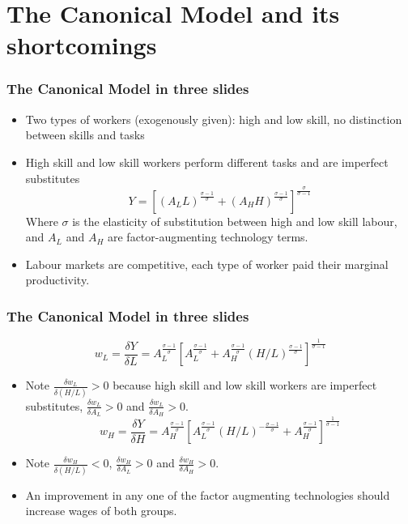 \documentclass[mathserif]{beamer}
\begin{document}
\section{The Canonical Model and its shortcomings}
\begin{frame}
\frametitle{The Canonical Model in three slides}
\begin{itemize}
\item Two types of workers (exogenously given): high and low skill, no distinction between skills and tasks
\item High skill and low skill workers perform different tasks and are imperfect substitutes
\begin{equation*}
Y=[(A_LL)^\frac{\sigma-1}{\sigma}+(A_HH)^\frac{\sigma-1}{\sigma}]^\frac{\sigma}{\sigma-1}
\end{equation*}
Where $\sigma$ is the elasticity of substitution between high and low skill labour, and $A_L$ and $A_H$ are factor-augmenting technology terms.
\item Labour markets are competitive, each type of worker paid their marginal productivity.
\end{itemize}
\end{frame}
\begin{frame}
\frametitle{The Canonical Model in three slides}
\begin{equation*}
w_L=\frac{\delta Y}{\delta L}=A_L^{\frac{\sigma-1}{\sigma}}[A_L^{\frac{\sigma-1}{\sigma}}+A_H^{\frac{\sigma-1}{\sigma}}(H/L)^{\frac{\sigma-1}{\sigma}}]^\frac{1}{\sigma-1}
\end{equation*}
\begin{itemize}
\item Note $\frac{\delta w_L}{\delta (H/L)}>0$ because high skill and low skill workers are imperfect substitutes, $\frac{\delta w_L}{\delta A_L}>0$  and $\frac{\delta w_L}{\delta A_H}>0$.
\begin{equation*}
w_H=\frac{\delta Y}{\delta H}=A_H^\frac{\sigma-1}{\sigma}[A_L^\frac{\sigma-1}{\sigma}(H/L)^{-\frac{\sigma-1}{\sigma}}+A_H^\frac{\sigma-1}{\sigma}]^\frac{1}{\sigma-1}
\end{equation*}
\item Note $\frac{\delta w_H}{\delta (H/L)}<0$, $\frac{\delta w_H}{\delta A_L}>0$ and $\frac{\delta w_H}{\delta A_H}>0$.
\item An improvement in any one of the factor augmenting technologies should increase wages of both groups.
\end{itemize}
\end{frame}
\end{document}
